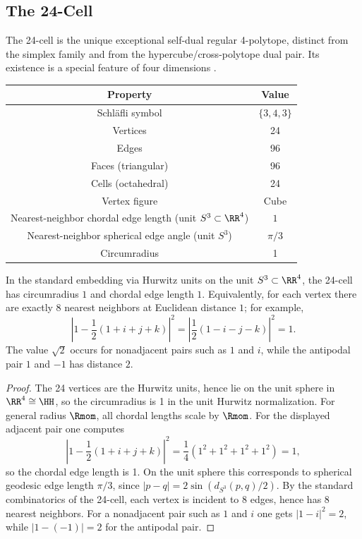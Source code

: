 \documentclass[11pt]{article}
\begin{document}
\subsection{The 24-Cell}
\label{p1:sec:24cell}
The 24-cell is the unique exceptional self-dual regular 4-polytope, distinct from the simplex family and from the hypercube/cross-polytope dual pair.  Its existence is a special feature of four dimensions \cite{coxeter1973regular,conwaySloane1999sphere}.

\begin{center}
\begin{tabular}{|c|c|}
\hline
Property & Value \\
\hline
Schläfli symbol & $\{3, 4, 3\}$ \\
Vertices & 24 \\
Edges & 96 \\
Faces (triangular) & 96 \\
Cells (octahedral) & 24 \\
Vertex figure & Cube \\
Nearest-neighbor chordal edge length (unit $S^3\subset\RR^4$) & $1$ \\
Nearest-neighbor spherical edge angle (unit $S^3$) & $\pi/3$ \\
Circumradius & 1 \\
\hline
\end{tabular}
\end{center}

\begin{proposition}
\label{p1:prop:24cell-adjacency}
In the standard embedding via Hurwitz units on the unit $S^3\subset\RR^4$, the 24-cell has
circumradius $1$ and chordal edge length $1$. Equivalently, for each vertex there
are exactly 8 nearest neighbors at Euclidean distance $1$; for example,
\begin{equation}
\left|1-\frac{1}{2}(1+i+j+k)\right|^2
= \left|\frac{1}{2}(1-i-j-k)\right|^2 = 1.
\end{equation}
The value $\sqrt{2}$ occurs for nonadjacent pairs such as $1$ and $i$, while the
antipodal pair $1$ and $-1$ has distance $2$.
\cite{coxeter1973regular,conwaySloane1999sphere}
\end{proposition}

\begin{proof}
The 24 vertices are the Hurwitz units, hence lie on the unit sphere in
$\RR^4 \cong \HH$, so the circumradius is 1 in the unit Hurwitz normalization. For general radius \(\Rmom\), all chordal lengths scale by \(\Rmom\). For the displayed adjacent pair one
computes
\[
\left|1-\frac{1}{2}(1+i+j+k)\right|^2
= \frac{1}{4}(1^2+1^2+1^2+1^2)=1,
\]
so the chordal edge length is 1. On the unit sphere this corresponds to
spherical geodesic edge length $\pi/3$, since $|p-q|=2\sin(d_{S^3}(p,q)/2)$.
By the standard combinatorics of the 24-cell, each
vertex is incident to 8 edges, hence has 8 nearest neighbors. For a nonadjacent
pair such as $1$ and $i$ one gets $|1-i|^2=2$, while $|1-(-1)|=2$ for the
antipodal pair.
\end{proof}
\end{document}
